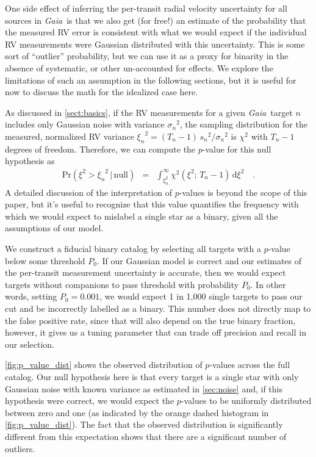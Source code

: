 \documentclass[modern, letterpaper]{aastex631}
\newcommand{\project}[1]{\textsl{#1}}
\newcommand{\Gaia}{\project{Gaia}}
\newcommand{\dd}{\ensuremath{\,\mathrm{d}}}
\begin{document}
One side effect of inferring the per-transit radial velocity uncertainty for all sources in \Gaia\ is that we also get (for free!) an estimate of the probability that the measured RV error is consistent with what we would expect if the individual RV measurements were Gaussian distributed with this uncertainty.
This is some sort of ``outlier'' probability, but we can use it as a proxy for binarity in the absence of systematic, or other un-accounted for effects.
We explore the limitations of such an assumption in the following sections, but it is useful for now to discuss the math for the idealized case here.

As discussed in \autoref{sect:basics}, if the RV measurements for a given \Gaia\ target $n$ includes only Gaussian noise with variance ${\sigma_n}^2$, the sampling distribution for the measured, normalized RV variance ${\xi_n}^2 = (T_n - 1)\,{s_n}^2 / {\sigma_n}^2$ is $\chi^2$ with $T_n - 1$ degrees of freedom.
Therefore, we can compute the $p$-value for this null hypothesis as
\begin{eqnarray}
	\mathrm{Pr}(\xi^2 > {\xi_n}^2\,|\,\mathrm{null}) &=& \int_{\xi_n^2}^\infty \chi^2 (\xi^2;\,T_n-1) \dd \xi^2 \quad.
\end{eqnarray}
A detailed discussion of the interpretation of $p$-values is beyond the scope of this paper, but it's useful to recognize that this value quantifies the frequency with which we would expect to mislabel a single star as a binary, given all the assumptions of our model.

We construct a fiducial binary catalog by selecting all targets with a $p$-value below some threshold $P_0$.
If our Gaussian model is correct and our estimates of the per-transit measurement uncertainty is accurate, then we would expect targets without companions to pass threshold with probability $P_0$.
In other words, setting $P_0 = 0.001$, we would expect 1 in 1,000 single targets to pass our cut and be incorrectly labelled as a binary.
This number does not directly map to the false positive rate, since that will also depend on the true binary fraction, however, it gives us a tuning parameter that can trade off precision and recall in our selection.

\autoref{fig:p_value_dist} shows the observed distribution of $p$-values across the full catalog.
Our null hypothesis here is that every target is a single star with only Gaussian noise with known variance as estimated in \autoref{sec:noise} and, if this hypothesis were correct, we would expect the $p$-values to be uniformly distributed between zero and one (as indicated by the orange dashed histogram in \autoref{fig:p_value_dist}).
The fact that the observed distribution is significantly different from this expectation shows that there are a significant number of outliers.
\end{document}
